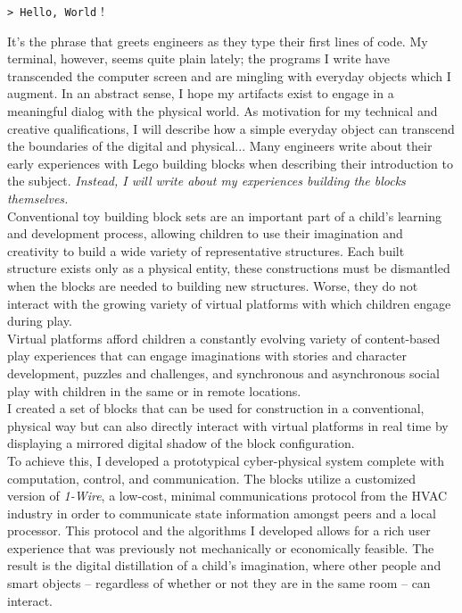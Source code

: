\documentclass[]{article}
\title{}
\author{}
\begin{document}
\begin{addmargin}[0em]{2em}
\verb!> Hello, World! !
\vspace{2mm}
\end{addmargin}

It's the phrase that greets engineers as they type their first lines of code. My terminal, however, seems quite plain lately; the programs I write have transcended the computer screen and are mingling with everyday objects which I augment. In an abstract sense, I hope my artifacts exist to engage in a meaningful dialog with the physical world. As motivation for my technical and creative qualifications, I will describe how a simple everyday object can transcend the boundaries of the digital and physical... Many engineers write about their early experiences with Lego building blocks when describing their introduction to the subject. \textit{Instead, I will write about my experiences building the blocks themselves.}\\

Conventional toy building block sets are an important part of a child's learning and development process, allowing children to use their imagination and creativity to build a wide variety of representative structures. Each built structure exists only as a physical entity, these constructions must be dismantled when the blocks are needed to building new structures. Worse, they do not interact with the growing variety of virtual platforms with which children engage during play.\\

Virtual platforms afford children a constantly evolving variety of content-based play experiences that can engage imaginations with stories and character development, puzzles and challenges, and synchronous and asynchronous social play with children in the same or in remote locations.\\

I created a set of blocks that can be used for construction in a conventional, physical way but can also directly interact with virtual platforms in real time by displaying a mirrored digital shadow of the block configuration.\\

To achieve this, I developed a prototypical cyber-physical system complete with computation, control, and communication.  The blocks utilize a customized version of \textit{1-Wire}, a low-cost, minimal communications protocol from the HVAC industry in order to communicate state information amongst peers and a local processor. This protocol and the algorithms I developed allows for a rich user experience that was previously not mechanically or economically feasible. The result is the digital distillation of a child's imagination, where other people and smart objects -- regardless of whether or not they are in the same room -- can interact.\\
\end{document}
